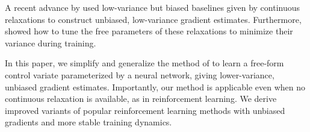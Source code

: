 \documentclass{article}
\begin{document}
A recent advance by \citet{tucker2017rebar} used low-variance but biased baselines given by continuous relaxations to construct unbiased, low-variance gradient estimates.
Furthermore, \citet{tucker2017rebar} showed how to tune the free parameters of these relaxations to minimize their variance during training.

In this paper, we simplify and generalize the method of \citet{tucker2017rebar} to learn a free-form control variate parameterized by a neural network, giving lower-variance, unbiased gradient estimates.
Importantly, our method is applicable even when no continuous relaxation is available, as in reinforcement learning.
We derive improved variants of popular reinforcement learning methods with unbiased gradients and more stable training dynamics.



\end{document}
